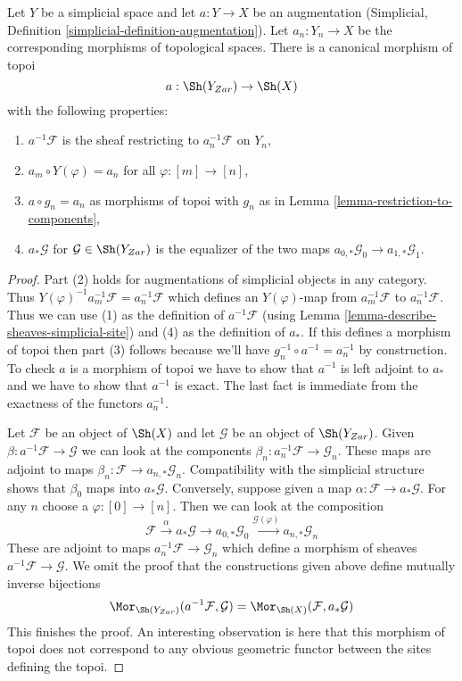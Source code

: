 \begin{lemma}
\label{lemma-augmentation}
Let $Y$ be a simplicial space and let $a : Y \to X$ be an augmentation
(Simplicial, Definition \ref{simplicial-definition-augmentation}).
Let $a_n : Y_n \to X$ be the corresponding morphisms of topological spaces.
There is a canonical morphism of topoi
$$
a : \Sh(Y_{Zar}) \to \Sh(X)
$$
with the following properties:
\begin{enumerate}
\item $a^{-1}\mathcal{F}$ is the sheaf restricting to $a_n^{-1}\mathcal{F}$
on $Y_n$,
\item $a_m \circ Y(\varphi) = a_n$ for all $\varphi : [m] \to [n]$,
\item $a \circ g_n = a_n$ as morphisms of topoi with
$g_n$ as in Lemma \ref{lemma-restriction-to-components},
\item $a_*\mathcal{G}$ for $\mathcal{G} \in \Sh(Y_{Zar})$
is the equalizer of the two maps
$a_{0, *}\mathcal{G}_0 \to a_{1, *}\mathcal{G}_1$.
\end{enumerate}
\end{lemma}

\begin{proof}
Part (2) holds for augmentations of simplicial objects in any category.
Thus $Y(\varphi)^{-1} a_m^{-1} \mathcal{F} = a_n^{-1}\mathcal{F}$
which defines an $Y(\varphi)$-map from $a_m^{-1}\mathcal{F}$
to $a_n^{-1}\mathcal{F}$.
Thus we can use (1) as the definition of $a^{-1}\mathcal{F}$ (using
Lemma \ref{lemma-describe-sheaves-simplicial-site}) and
(4) as the definition of $a_*$. If this defines a morphism of topoi
then part (3) follows because we'll have $g_n^{-1} \circ a^{-1} = a_n^{-1}$
by construction. To check $a$ is a morphism of topoi we have to show
that $a^{-1}$ is left adjoint to $a_*$ and we have to show that
$a^{-1}$ is exact. The last fact is immediate from the exactness of
the functors $a_n^{-1}$.

\medskip\noindent
Let $\mathcal{F}$ be an object of $\Sh(X)$ and let $\mathcal{G}$
be an object of $\Sh(Y_{Zar})$. Given
$\beta : a^{-1}\mathcal{F} \to \mathcal{G}$ we can look at the
components $\beta_n : a_n^{-1}\mathcal{F} \to \mathcal{G}_n$.
These maps are adjoint to maps
$\beta_n : \mathcal{F} \to a_{n, *}\mathcal{G}_n$.
Compatibility with the simplicial structure shows that
$\beta_0$ maps into $a_*\mathcal{G}$.
Conversely, suppose given a map $\alpha : \mathcal{F} \to a_*\mathcal{G}$.
For any $n$ choose a $\varphi : [0] \to [n]$. Then we can look at
the composition
$$
\mathcal{F} \xrightarrow{\alpha} a_*\mathcal{G}
\to a_{0, *}\mathcal{G}_0 \xrightarrow{\mathcal{G}(\varphi)}
a_{n, *}\mathcal{G}_n
$$
These are adjoint to maps $a_n^{-1}\mathcal{F} \to \mathcal{G}_n$
which define a morphism of sheaves $a^{-1}\mathcal{F} \to \mathcal{G}$.
We omit the proof that the constructions given above define
mutually inverse bijections
$$
\Mor_{\Sh(Y_{Zar})}(a^{-1}\mathcal{F}, \mathcal{G}) =
\Mor_{\Sh(X)}(\mathcal{F}, a_*\mathcal{G})
$$
This finishes the proof. An interesting observation is here that
this morphism of topoi does not correspond to any obvious geometric
functor between the sites defining the topoi.
\end{proof}

